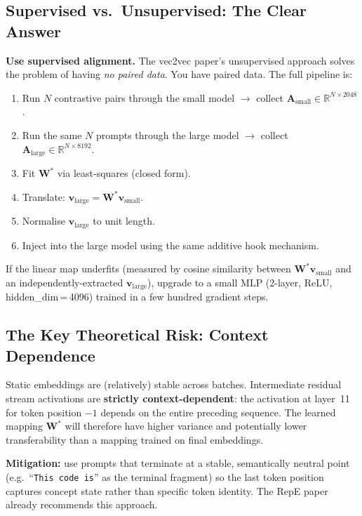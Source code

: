 \documentclass[11pt, a4paper]{article}
\begin{document}
\subsection{Supervised vs.\ Unsupervised: The Clear Answer}

\textbf{Use supervised alignment.} The vec2vec paper's unsupervised approach
solves the problem of having \emph{no paired data}. You have paired data. The
full pipeline is:

\begin{enumerate}[leftmargin=2em]
  \item Run $N$ contrastive pairs through the small model $\to$ collect
        $\mathbf{A}_{\text{small}} \in \mathbb{R}^{N \times 2048}$.
  \item Run the same $N$ prompts through the large model $\to$ collect
        $\mathbf{A}_{\text{large}} \in \mathbb{R}^{N \times 8192}$.
  \item Fit $\mathbf{W}^*$ via least-squares (closed form).
  \item Translate: $\mathbf{v}_{\text{large}} = \mathbf{W}^* \mathbf{v}_{\text{small}}$.
  \item Normalise $\mathbf{v}_{\text{large}}$ to unit length.
  \item Inject into the large model using the same additive hook mechanism.
\end{enumerate}

If the linear map underfits (measured by cosine similarity between
$\mathbf{W}^*\mathbf{v}_{\text{small}}$ and an independently-extracted
$\mathbf{v}_{\text{large}}$), upgrade to a small MLP (2-layer, ReLU,
hidden\_dim\,=\,4096) trained in a few hundred gradient steps.

\subsection{The Key Theoretical Risk: Context Dependence}

Static embeddings are (relatively) stable across batches. Intermediate
residual stream activations are \textbf{strictly context-dependent}: the
activation at layer~11 for token position $-1$ depends on the entire preceding
sequence. The learned mapping $\mathbf{W}^*$ will therefore have higher
variance and potentially lower transferability than a mapping trained on final
embeddings.

\textbf{Mitigation:} use prompts that terminate at a stable, semantically
neutral point (e.g.\ ``\texttt{This code is}'' as the terminal fragment) so
the last token position captures concept state rather than specific token
identity. The RepE paper already recommends this approach.
\end{document}
